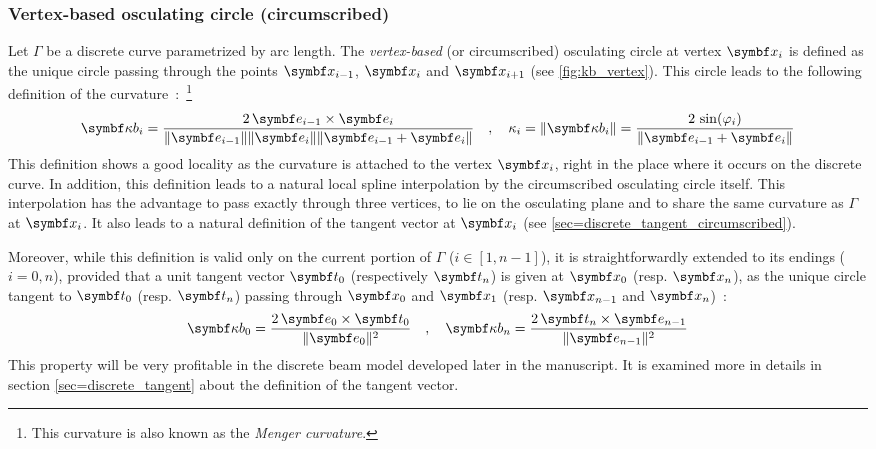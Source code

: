 \subsubsection{Vertex-based osculating circle (circumscribed)}\label{sec=circumscribed}
Let $\Gamma$ be a discrete curve parametrized by arc length. The \emph{vertex-based} (or circumscribed) osculating circle at vertex $\vect{x}_{i}$ is defined as the unique circle passing through the points $\vect{x}_{i-1}$, $\vect{x}_{i}$ and $\vect{x}_{i+1}$ (see \cref{fig:kb_vertex}). This circle leads to the following definition of the curvature~:~\footnote{This curvature is also known as the \emph{Menger curvature}.}
\begin{equation}
	\vect{\kappa b}_i = \frac{2 \, \vect{e}_{i-1} \times \vect{e}_{i}}{\norm{\vect{e}_{i-1}} \norm{\vect{e}_{i}} \norm{\vect{e}_{i-1} + \vect{e}_{i}} }
	\quad , \quad
	\kappa_i = \norm{\vect{\kappa b}_i} = \frac{2 \, \sin(\varphi_i)}{\norm{\vect{e}_{i-1} + \vect{e}_{i}}}
\label{eq:def_kb_vertex}
\end{equation}
This definition shows a good locality as the curvature is attached to the vertex $\vect{x}_{i}$, right in the place where it occurs on the discrete curve. In addition, this definition leads to a natural local spline interpolation by the circumscribed osculating circle itself. This interpolation has the advantage to pass exactly through three vertices, to lie on the osculating plane and to share the same curvature as $\Gamma$ at $\vect{x}_{i}$. It also leads to a natural definition of the tangent vector at $\vect{x}_{i}$ (see \cref{sec=discrete_tangent_circumscribed}).

Moreover, while this definition is valid only on the current portion of $\Gamma$ ($i \in[1, n-1]$), it is straightforwardly extended to its endings ($i=0,n$), provided that a unit tangent vector $\vect{t}_{0}$ (respectively $\vect{t}_{n}$) is given at $\vect{x}_{0}$ (resp. $\vect{x}_{n}$), as the unique circle tangent to $\vect{t}_{0}$ (resp. $\vect{t}_{n}$) passing through $\vect{x}_0$ and $\vect{x}_1$ (resp. $\vect{x}_{n-1}$ and $\vect{x}_n$)~:
\begin{equation}
	\vect{\kappa b}_0 = \frac{2 \, \vect{e}_{0} \times \vect{t}_{0}}{\norm{\vect{e}_{0}}^2} 
	\quad , \quad
	\vect{\kappa b}_n = \frac{2 \, \vect{t}_{n} \times \vect{e}_{n-1}}{\norm{\vect{e}_{n-1}}^2} 
\end{equation}
This property will be very profitable in the discrete beam model developed later in the manuscript. It is examined more in details in section \cref{sec=discrete_tangent} about the definition of the tangent vector.

